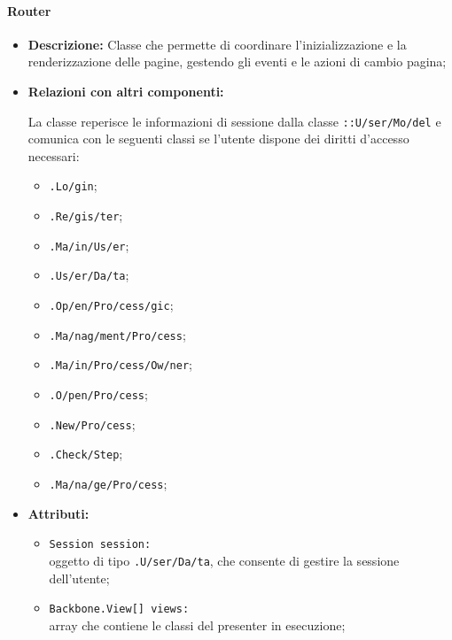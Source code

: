 \paragraph{Router}
\label{router}
\begin{flushleft}
\begin{itemize}
\item \textbf{Descrizione:} Classe che permette di coordinare l'inizializzazione e la renderizzazione delle pagine, gestendo gli eventi e le azioni di cambio pagina;
\item \textbf{Relazioni con altri componenti:}
\begin{sloppypar}
La classe reperisce le informazioni di sessione dalla classe \texttt{\model{}::U\fshyp{}ser\fshyp{}Mo\fshyp{}del} e comunica con le seguenti classi se l'utente dispone dei diritti d'accesso necessari:
\begin{itemize}
\item \texttt{\logic{}.Lo\fshyp{}gin};
\item \texttt{\logicUser{}.Re\fshyp{}gis\fshyp{}ter};
\item \texttt{\logicUser{}.Ma\fshyp{}in\fshyp{}Us\fshyp{}er};
\item \texttt{\logicUser{}.Us\fshyp{}er\fshyp{}Da\fshyp{}ta};
\item \texttt{\logicUser{}.Op\fshyp{}en\fshyp{}Pro\fshyp{}cess\fshyp{}gic};
\item \texttt{\logicUser{}.Ma\fshyp{}nag\fshyp{}ment\fshyp{}Pro\fshyp{}cess};
\item \texttt{\logicAdmin{}.Ma\fshyp{}in\fshyp{}Pro\fshyp{}cess\fshyp{}Ow\fshyp{}ner};
\item \texttt{\logicAdmin{}.O\fshyp{}pen\fshyp{}Pro\fshyp{}cess};
\item \texttt{\logicAdmin{}.New\fshyp{}Pro\fshyp{}cess};
\item \texttt{\logicAdmin{}.Check\fshyp{}Step};
\item \texttt{\logicAdmin{}.Ma\fshyp{}na\fshyp{}ge\fshyp{}Pro\fshyp{}cess};
\end{itemize}
\end{sloppypar}
\item \textbf{Attributi:}
\begin{sloppypar}
\begin{itemize}
\item \texttt{Session session:}\\ oggetto di tipo \texttt{\model{}.U\fshyp{}ser\fshyp{}Da\fshyp{}ta}, che consente di gestire la sessione dell'utente;
\item \texttt{Backbone.View[] views:}\\ array che contiene le classi del presenter in esecuzione;

\end{itemize}
\end{sloppypar}
\end{itemize}
\end{flushleft}
